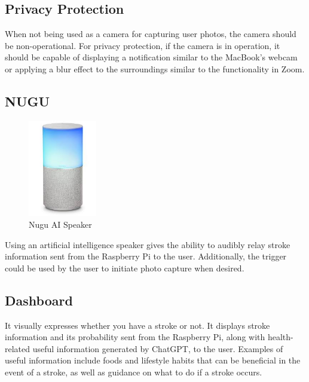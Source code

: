 \subsection{Privacy Protection}
When not being used as a camera for capturing user photos, the camera should be non-operational. For privacy protection, if the camera is in operation, it should be capable of displaying a notification similar to the MacBook's webcam or applying a blur effect to the surroundings similar to the functionality in Zoom.\\

\subsection{NUGU}

\begin{figure}[htp]
\centering
\includegraphics[width=3cm]{images/nugu.jpeg}
\caption{Nugu AI Speaker}
\label{fig:nugu}
\end{figure}

Using an artificial intelligence speaker gives the ability to audibly relay stroke information sent from the Raspberry Pi to the user. Additionally, the trigger could be used by the user to initiate photo capture when desired.\\

\subsection{Dashboard}
It visually expresses whether you have a stroke or not. It displays stroke information and its probability sent from the Raspberry Pi, along with health-related useful information generated by ChatGPT, to the user. Examples of useful information include foods and lifestyle habits that can be beneficial in the event of a stroke, as well as guidance on what to do if a stroke occurs.\\

